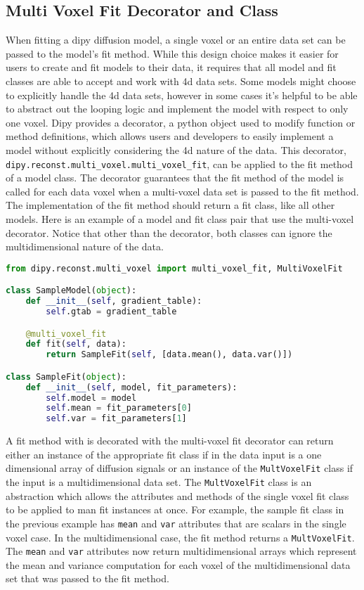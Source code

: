 \subsection{Multi Voxel Fit Decorator and Class}

When fitting a dipy diffusion model, a single voxel or an entire data set can be passed to the model's fit method. While this design choice makes it easier for users to create and fit models to their data, it requires that all model and fit classes are able to accept and work with 4d data sets. Some models might choose to explicitly handle the 4d data sets, however in some cases it's helpful to be able to abstract out the looping logic and implement the model with respect to only one voxel. Dipy provides a decorator, a python object used to modify function or method definitions, which allows users and developers to easily implement a model without explicitly considering the 4d nature of the data. This decorator, \verb|dipy.reconst.multi_voxel.multi_voxel_fit|, can be applied to the fit method of a model class. The decorator guarantees that the fit method of the model is called for each data voxel when a multi-voxel data set is passed to the fit method. The implementation of the fit method should return a fit class, like all other models. Here is an example of a model and fit class pair that use the multi-voxel decorator. Notice that other than the decorator, both classes can ignore the multidimensional nature of the data.

\begin{lstlisting}[language=python]
from dipy.reconst.multi_voxel import multi_voxel_fit, MultiVoxelFit

class SampleModel(object):
    def __init__(self, gradient_table):
        self.gtab = gradient_table

    @multi_voxel_fit
    def fit(self, data):
        return SampleFit(self, [data.mean(), data.var()])

class SampleFit(object):
    def __init__(self, model, fit_parameters):
        self.model = model
        self.mean = fit_parameters[0]
        self.var = fit_parameters[1]
\end{lstlisting}

A fit method with is decorated with the multi-voxel fit decorator can return either an instance of the appropriate fit class if in the data input is a one dimensional array of diffusion signals or an instance of the \verb|MultVoxelFit| class if the input is a multidimensional data set. The \verb|MultVoxelFit| class is an abstraction which allows the attributes and methods of the single voxel fit class to be applied to man fit instances at once. For example, the sample fit class in the previous example has \verb|mean| and \verb|var| attributes that are scalars in the single voxel case. In the multidimensional case, the fit method returns a \verb|MultVoxelFit|. The \verb|mean| and \verb|var| attributes now return multidimensional arrays which represent the mean and variance computation for each voxel of the multidimensional data set that was passed to the fit method.

